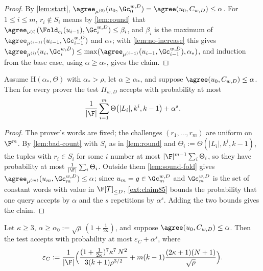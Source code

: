 {{\begin{proof}
By \ref{lem:start}, $\agree_{\mu^{(0)}}(u_0,\Gc_0^{w,D})=\agree(u_0,C_{w,D})\le\alpha$. For
$1\le i\le m$, $r_i\notin S_i$ means by \ref{lem:round} that
$\agree_{\nu^{(i)}}(\Fold_{c_i}(u_{i-1}),\Gc_i^{w,D})\le\beta_i$, and $\beta_i$ is the maximum of
$\agree_{\mu^{(i-1)}}(u_{i-1},\Gc_{i-1}^{w,D})$ and $\alpha_*$; with \ref{lem:no-increase} this
gives
$\agree_{\mu^{(i)}}(u_i,\Gc_i^{w,D})\le\max(\agree_{\mu^{(i-1)}}(u_{i-1},\Gc_{i-1}^{w,D}),\alpha_*)$,
and induction from the base case, using $\alpha\ge\alpha_*$, gives the claim.
\end{proof}

\begin{theorem}\label{thm:reduction}
Assume $\mathrm H(\alpha_*,\Theta)$ with $\alpha_*>\rho$, let $\alpha\ge\alpha_*$, and suppose
$\agree(u_0,C_{w,D})\le\alpha$. Then for every prover the test $\Pi_{w,D}$ accepts with
probability at most
\[
\frac1{|\F|}\sum_{i=1}^{m}\Theta\big(|L_i|,k^i,k-1\big)+\alpha^s .
\]
\end{theorem}

\begin{proof}
The prover's words are fixed; the challenges $(r_1,\dots,r_m)$ are uniform on $\F^m$. By
\ref{lem:bad-count} with $S_i$ as in \ref{lem:round} and $\Theta_i:=\Theta(|L_i|,k^i,k-1)$, the
tuples with $r_i\in S_i$ for some $i$ number at most $|\F|^{m-1}\sum_i\Theta_i$, so they have
probability at most $\frac1{|\F|}\sum_i\Theta_i$. Outside them \ref{lem:sound-fold} gives
$\agree_{\mu^{(m)}}(u_m,\Gc_m^{w,D})\le\alpha$; since $u_m=g\in\Gc_m^{w,D}$ and $\Gc_m^{w,D}$ is the
set of constant words with value in $\F[T]_{\le D}$, \ref{ext:claim85} bounds the probability that
one query accepts by $\alpha$ and the $s$ repetitions by $\alpha^s$. Adding the two bounds gives the
claim.
\end{proof}

\begin{consequence}\label{cor:johnson}
Let $\kappa\ge3$, $\alpha\ge\alpha_0:=\sqrt\rho\,(1+\frac1{2\kappa})$, and
suppose $\agree(u_0,C_{w,D})\le\alpha$. Then the test accepts with probability at most
$\varepsilon_C+\alpha^s$, where
\[
\varepsilon_C:=\frac1{|\F|}\Big(\frac{(1+\frac1{2\kappa})^7\kappa^7\,N^2}{3(k+1)\rho^{3/2}}
+m(k-1)\frac{(2\kappa+1)(N+1)}{\sqrt\rho}\Big).
\]
\end{consequence}

}}
